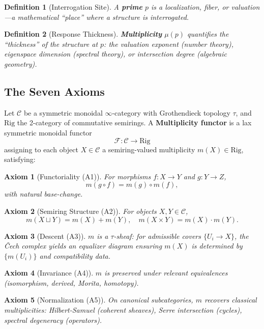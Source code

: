 \documentclass[12pt,a4paper]{article}
\newtheorem{definition}{Definition}[section]
\newtheorem{axiom}{Axiom}[section]
\begin{document}
\begin{definition}[Interrogation Site]
A \textbf{prime} $p$ is a localization, fiber, or valuation—a mathematical ``place'' where a structure is interrogated.
\end{definition}

\begin{definition}[Response Thickness]
\textbf{Multiplicity} $\mu(p)$ quantifies the ``thickness'' of the structure at $p$: the valuation exponent (number theory), eigenspace dimension (spectral theory), or intersection degree (algebraic geometry).
\end{definition}

\subsection{The Seven Axioms}

Let $\mathcal{C}$ be a symmetric monoidal $\infty$-category with Grothendieck topology $\tau$, and $\text{Rig}$ the 2-category of commutative semirings. A \textbf{Multiplicity functor} is a lax symmetric monoidal functor
\[
\mathcal{F}: \mathcal{C} \to \text{Rig}
\]
assigning to each object $X \in \mathcal{C}$ a semiring-valued multiplicity $m(X) \in \text{Rig}$, satisfying:

\begin{axiom}[Functoriality (A1)]
For morphisms $f: X \to Y$ and $g: Y \to Z$,
\[
m(g \circ f) = m(g) \circ m(f),
\]
with natural base-change.
\end{axiom}

\begin{axiom}[Semiring Structure (A2)]
For objects $X, Y \in \mathcal{C}$,
\[
m(X \sqcup Y) = m(X) + m(Y), \quad m(X \times Y) = m(X) \cdot m(Y).
\]
\end{axiom}

\begin{axiom}[Descent (A3)]
$m$ is a $\tau$-sheaf: for admissible covers $\{U_i \to X\}$, the \v{C}ech complex yields an equalizer diagram ensuring $m(X)$ is determined by $\{m(U_i)\}$ and compatibility data.
\end{axiom}

\begin{axiom}[Invariance (A4)]
$m$ is preserved under relevant equivalences (isomorphism, derived, Morita, homotopy).
\end{axiom}

\begin{axiom}[Normalization (A5)]
On canonical subcategories, $m$ recovers classical multiplicities: Hilbert-Samuel (coherent sheaves), Serre intersection (cycles), spectral degeneracy (operators).
\end{axiom}
\end{document}
